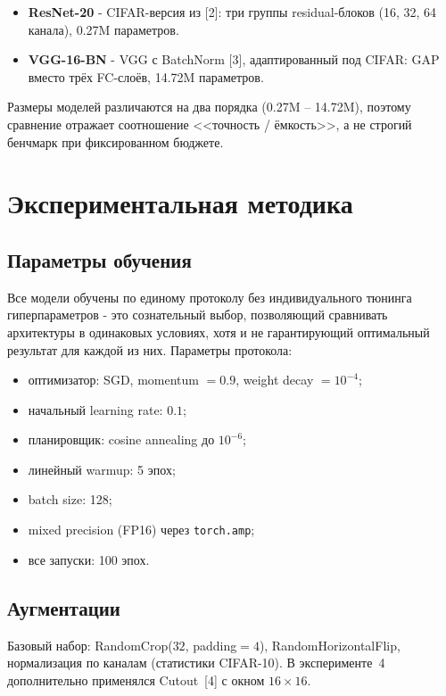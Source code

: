 \documentclass[12pt,a4paper]{article}
\newcommand{\resnetParams}{0.27}
\newcommand{\vggParams}{14.72}
\begin{document}
\begin{itemize}
    \item \textbf{ResNet-20} - CIFAR-версия из [2]: три группы residual-блоков (16, 32, 64 канала), \resnetParams{}M параметров.
    \item \textbf{VGG-16-BN} - VGG с BatchNorm [3], адаптированный под CIFAR: GAP вместо трёх FC-слоёв, \vggParams{}M параметров.
\end{itemize}

Размеры моделей различаются на два порядка (\resnetParams{}M -- \vggParams{}M), поэтому сравнение отражает соотношение <<точность / ёмкость>>, а не строгий бенчмарк при фиксированном бюджете.


\section{Экспериментальная методика}

\subsection{Параметры обучения}

Все модели обучены по единому протоколу без индивидуального тюнинга гиперпараметров - это сознательный выбор, позволяющий сравнивать архитектуры в одинаковых условиях, хотя и не гарантирующий оптимальный результат для каждой из них. Параметры протокола:
\begin{itemize}
    \item оптимизатор: SGD, momentum $= 0.9$, weight decay $= 10^{-4}$;
    \item начальный learning rate: $0.1$;
    \item планировщик: cosine annealing до $10^{-6}$;
    \item линейный warmup: 5 эпох;
    \item batch size: 128;
    \item mixed precision (FP16) через \texttt{torch.amp};
    \item все запуски: 100 эпох.
\end{itemize}

\subsection{Аугментации}

Базовый набор: RandomCrop($32$, padding${}=4$), RandomHorizontalFlip, нормализация по каналам (статистики CIFAR-10). В эксперименте~4 дополнительно применялся Cutout~[4] с окном $16\times16$.
\end{document}
